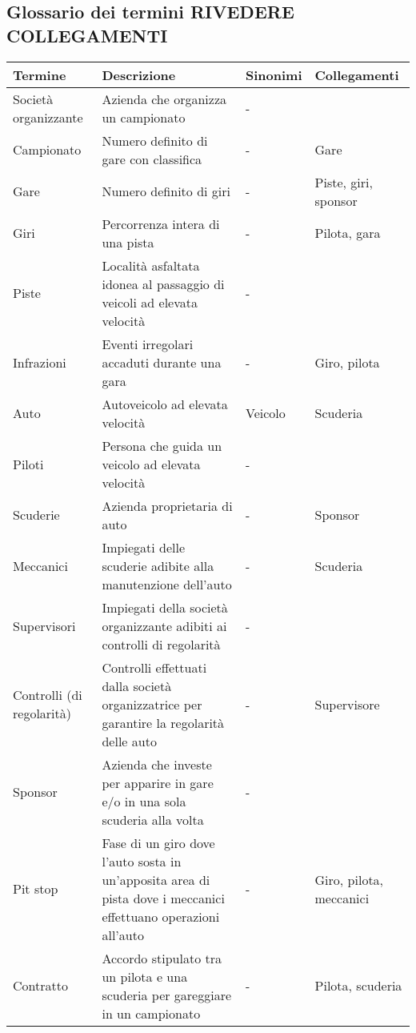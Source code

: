 \documentclass[11pt]{article}
\begin{document}
\subsection{Glossario dei termini \textbf{RIVEDERE COLLEGAMENTI}}
\begin{tabularx}{\linewidth}{
        |>{\hsize=0.9\hsize}X|%
        >{\hsize=1.8\hsize}X|%
        >{\hsize=0.6\hsize}X|%
        >{\hsize=0.7\hsize}X|%
    }
    \hline
    \textbf{Termine} & \textbf{Descrizione} & \textbf{Sinonimi} & \textbf{Collegamenti} \\
    \hline
    Società organizzante & Azienda che organizza un campionato & - & \\
    \hline
    Campionato & Numero definito di gare con classifica & - & Gare \\
    \hline
    Gare & Numero definito di giri & - & Piste, giri, sponsor \\
    \hline
    Giri & Percorrenza intera di una pista & - & Pilota, gara \\
    \hline
    Piste & Località asfaltata idonea al passaggio di veicoli ad elevata velocità & - & \\
    \hline
    Infrazioni & Eventi irregolari accaduti durante una gara & - & Giro, pilota \\
    \hline
    Auto & Autoveicolo ad elevata velocità & Veicolo & Scuderia \\
    \hline
    Piloti & Persona che guida un veicolo ad elevata velocità & - & \\
    \hline
    Scuderie & Azienda proprietaria di auto & - & Sponsor \\
    \hline
    Meccanici & Impiegati delle scuderie adibite alla manutenzione dell'auto & - & Scuderia \\
    \hline
    Supervisori & Impiegati della società organizzante adibiti ai controlli di regolarità & - & \\
    \hline
    Controlli (di regolarità) & Controlli effettuati dalla società organizzatrice per garantire la regolarità delle auto & - & Supervisore \\
    \hline
    Sponsor & Azienda che investe per apparire in gare e/o in una sola scuderia alla volta & - & \\
    \hline
    Pit stop & Fase di un giro dove l'auto sosta in un'apposita area di pista dove i meccanici effettuano operazioni all'auto & - & Giro, pilota, meccanici \\
    \hline
    Contratto & Accordo stipulato tra un pilota e una scuderia per gareggiare in un campionato & - & Pilota, scuderia \\
    \hline
\end{tabularx}    
\end{document}
